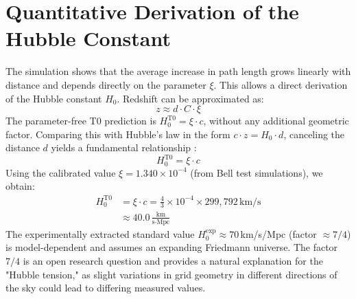 	\section{Quantitative Derivation of the Hubble Constant}
	The simulation shows that the average increase in path length grows linearly with distance and depends directly on the parameter $\xi$. This allows a direct derivation of the Hubble constant $H_0$.
	Redshift can be approximated as:
	\begin{equation}
		z \approx d \cdot C \cdot \xi
	\end{equation}
	The parameter-free T0 prediction is $H_0^{\text{T0}} = \xi \cdot c$, without any additional geometric factor.
	Comparing this with Hubble's law in the form $c \cdot z = H_0 \cdot d$, canceling the distance $d$ yields a fundamental relationship \cite{pascher:geometric_formalism}:
	\begin{equation}
		H_0^{\text{T0}} = \xi \cdot c
	\end{equation}
	Using the calibrated value $\xi = 1.340 \times 10^{-4}$ (from Bell test simulations), we obtain:
	\begin{align*}
		H_0^{\text{T0}} &= \xi \cdot c = \frac{4}{3} \times 10^{-4} \times 299{,}792\,\text{km/s} \\
		&\approx 40.0 \, \frac{\text{km}}{\text{s} \cdot \text{Mpc}}
	\end{align*}
	The experimentally extracted standard value $H_0^{\text{exp}} \approx 70\,$km/s/Mpc (factor $\approx 7/4$) is model-dependent and assumes an expanding Friedmann universe. The factor $7/4$ is an open research question \cite{riess2019} and provides a natural explanation for the "Hubble tension," as slight variations in grid geometry in different directions of the sky could lead to differing measured values.
